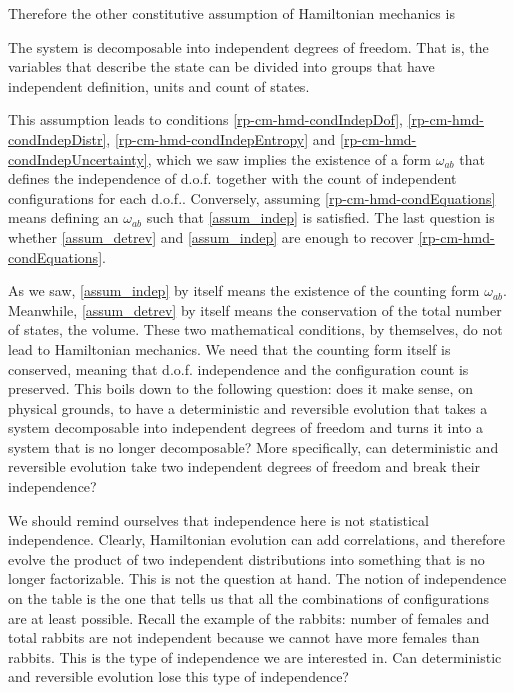 Therefore the other constitutive assumption of Hamiltonian mechanics is
\renewcommand{\theassump}{IND}
\begin{assump}\label{assum_indep}
	The system is decomposable into independent degrees of freedom. That is, the variables that describe the state can be divided into groups that have independent definition, units and count of states.
\end{assump}
\renewcommand{\theassump}{\Roman{assump}}
This assumption leads to conditions \ref{rp-cm-hmd-condIndepDof}, \ref{rp-cm-hmd-condIndepDistr}, \ref{rp-cm-hmd-condIndepEntropy} and
\ref{rp-cm-hmd-condIndepUncertainty}, which we saw implies the existence of a form $\omega_{ab}$ that defines the independence of d.o.f. together with the count of independent configurations for each d.o.f.. Conversely, assuming \ref{rp-cm-hmd-condEquations} means defining an $\omega_{ab}$ such that \ref{assum_indep} is satisfied. The last question is whether \ref{assum_detrev} and \ref{assum_indep} are enough to recover \ref{rp-cm-hmd-condEquations}.

As we saw, \ref{assum_indep} by itself means the existence of the counting form $\omega_{ab}$. Meanwhile, \ref{assum_detrev} by itself means the conservation of the total number of states, the volume. These two mathematical conditions, by themselves, do not lead to Hamiltonian mechanics. We need that the counting form itself is conserved, meaning that d.o.f. independence and the configuration count is preserved. This boils down to the following question: does it make sense, on physical grounds, to have a deterministic and reversible evolution that takes a system decomposable into independent degrees of freedom and turns it into a system that is no longer decomposable? More specifically, can deterministic and reversible evolution take two independent degrees of freedom and break their independence?

We should remind ourselves that independence here is not statistical independence. Clearly, Hamiltonian evolution can add correlations, and therefore evolve the product of two independent distributions into something that is no longer factorizable. This is not the question at hand. The notion of independence on the table is the one that tells us that all the combinations of configurations are at least possible. Recall the example of the rabbits: number of females and total rabbits are not independent because we cannot have more females than rabbits. This is the type of independence we are interested in. Can deterministic and reversible evolution lose this type of independence?

